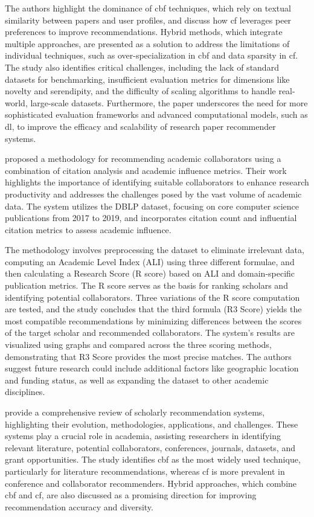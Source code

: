 The authors highlight the dominance of \gls{cbf} techniques, which rely on textual similarity between papers and user profiles, and discuss how \gls{cf} leverages peer preferences to improve recommendations.
Hybrid methods, which integrate multiple approaches, are presented as a solution to address the limitations of individual techniques, such as over-specialization in \gls{cbf} and data sparsity in \gls{cf}.
The study also identifies critical challenges, including the lack of standard datasets for benchmarking, insufficient evaluation metrics for dimensions like novelty and serendipity, and the difficulty of scaling algorithms to handle real-world, large-scale datasets.
Furthermore, the paper underscores the need for more sophisticated evaluation frameworks and advanced computational models, such as \gls{dl}, to improve the efficacy and scalability of research paper recommender systems.

\cite{Jagadishwari2023} proposed a methodology for recommending academic collaborators using a combination of citation analysis and academic influence metrics.
Their work highlights the importance of identifying suitable collaborators to enhance research productivity and addresses the challenges posed by the vast volume of academic data.
The system utilizes the DBLP dataset, focusing on core computer science publications from 2017 to 2019, and incorporates citation count and influential citation metrics to assess academic influence.

The methodology involves preprocessing the dataset to eliminate irrelevant data, computing an Academic Level Index (ALI) using three different formulae, and then calculating a Research Score (R score) based on ALI and domain-specific publication metrics.
The R score serves as the basis for ranking scholars and identifying potential collaborators.
Three variations of the R score computation are tested, and the study concludes that the third formula (R3 Score) yields the most compatible recommendations by minimizing differences between the scores of the target scholar and recommended collaborators.
The system's results are visualized using graphs and compared across the three scoring methods, demonstrating that R3 Score provides the most precise matches.
The authors suggest future research could include additional factors like geographic location and funding status, as well as expanding the dataset to other academic disciplines.

\cite{Zhang2023} provide a comprehensive review of scholarly recommendation systems, highlighting their evolution, methodologies, applications, and challenges.
These systems play a crucial role in academia, assisting researchers in identifying relevant literature, potential collaborators, conferences, journals, datasets, and grant opportunities.
The study identifies \gls{cbf} as the most widely used technique, particularly for literature recommendations, whereas \gls{cf} is more prevalent in conference and collaborator recommenders.
Hybrid approaches, which combine \gls{cbf} and \gls{cf}, are also discussed as a promising direction for improving recommendation accuracy and diversity.

